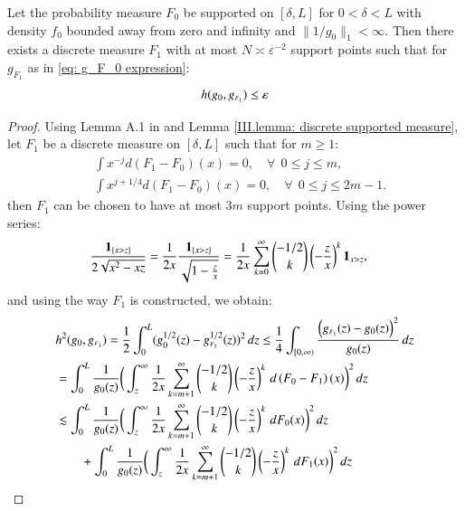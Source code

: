 \begin{lemma}\label{III.lemma: hellinger discrete approximation}
Let the probability measure $F_0$ be supported on $[\delta,L]$ for $0 < \delta < L$ with density $f_0$ bounded away from zero and infinity and $\| 1/ g_0 \|_1 < \infty$. Then there exists a discrete measure $F_1$ with at most $N \asymp \varepsilon^{-2} $ support points such that for $g_{\scriptscriptstyle{F_1}}$ as in \eqref{eq: g_F_0 expression}:
\begin{align*}
    h(g_0,g_{\scriptscriptstyle{F_{\scaleto{1}{3.2pt}}}}) \leq \varepsilon
\end{align*}
\end{lemma}
\begin{proof}
Using Lemma A.1 in \cite{23} and Lemma \ref{III.lemma: discrete supported measure}, let $F_1$ be a discrete measure on $[\delta,L]$ such that for $m \geq 1$:
\begin{align*}
&\int x^{-j} d\left(F_1-F_0\right)(x)=0, \quad \forall \: \: 0 \leq j \leq m, \\
&\int x^{j+1/4} d\left(F_1-F_0\right)(x)=0, \quad \forall \: \: 0 \leq j \leq 2m-1.
\end{align*}
then $F_1$ can be chosen to have at most $3m$ support points. Using the power series:
\begin{align*}
    &\frac{\mathbf{1}_{\left\{x > z\right\}}}{2 \sqrt{x^2 - xz}} = \frac{1}{2x} \frac{\mathbf{1}_{\left\{x>z\right\}}}{\sqrt{1 - \frac{z}{x}}} = \frac{1}{2x} \sum_{k=0}^{\infty} \binom{-1/2}{k} \left( - \frac{z}{x} \right)^k \mathbf{1}_{x>z}, 
\end{align*}
and using the way $F_1$ is constructed, we obtain:
\begin{align*}
    &  h^2(g_0,g_{\scriptscriptstyle{F_{\scaleto{1}{3.2pt}}}}) = \frac{1}{2} \int_0^L  (g^{1/2}_0(z) - g^{1/2}_{\scriptscriptstyle{F_{\scaleto{1}{3.2pt}}}}(z))^2 \, dz \leq \frac{1}{4} \int_{[0, \infty)} \frac{\left(g_{\scriptscriptstyle{F_{\scaleto{1}{3.2pt}}}}(z)-g_0(z)\right)^2}{g_0(z)} \,  d z \\
     & = \int_{0}^L \frac{1}{g_0(z)} \bigg( \int_{z}^\infty \frac{1}{2x} \sum_{k=m+1}^{\infty} \binom{-1/2}{k} \left(- \frac{z}{x} \right)^k \, d\left(F_0 - F_1 \right)(x) \bigg)^2 \, dz \\
     &\lesssim \int_{0}^L \frac{1}{g_0(z)} \bigg( \int_{z}^\infty \frac{1}{2x} \sum_{k=m+1}^{\infty} \binom{-1/2}{k} \left(- \frac{z}{x} \right)^k \, dF_0 (x) \bigg)^2 \, dz \\
     &\quad \quad + \int_{0}^L \frac{1}{g_0(z)} \bigg( \int_{z}^\infty \frac{1}{2x} \sum_{k=m+1}^{\infty} \binom{-1/2}{k} \left(- \frac{z}{x} \right)^k \, dF_1 (x) \bigg)^2 \, dz \\

\end{align*}
\end{proof}
